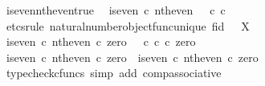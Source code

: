 \begin{isabellebody}
\endisatagproof
{\isafoldproof}%
%
\isadelimproof
\isanewline
%
\endisadelimproof
\isanewline
{}\isamarkupfalse%
\ is{\isacharunderscore}{\kern0pt}even{\isacharunderscore}{\kern0pt}nth{\isacharunderscore}{\kern0pt}even{\isacharunderscore}{\kern0pt}true{\isacharcolon}{\kern0pt}\isanewline
\ \ {\isachardoublequoteopen}is{\isacharunderscore}{\kern0pt}even\ {\isasymcirc}\isactrlsub c\ nth{\isacharunderscore}{\kern0pt}even\ {\isacharequal}{\kern0pt}\ {\isasymt}\ {\isasymcirc}\isactrlsub c\ {\isasymbeta}\isactrlbsub {\isasymnat}\isactrlsub c\isactrlesub {\isachardoublequoteclose}\isanewline
%
\isadelimproof
%
\endisadelimproof
%
\isatagproof
{}\isamarkupfalse%
\ {\isacharparenleft}{\kern0pt}etcs{\isacharunderscore}{\kern0pt}rule\ natural{\isacharunderscore}{\kern0pt}number{\isacharunderscore}{\kern0pt}object{\isacharunderscore}{\kern0pt}func{\isacharunderscore}{\kern0pt}unique{\isacharbrackleft}{\kern0pt}\ f{\isacharequal}{\kern0pt}{\isachardoublequoteopen}id\ {\isasymOmega}{\isachardoublequoteclose}{\isacharcomma}{\kern0pt}\ \ X{\isacharequal}{\kern0pt}{\isasymOmega}{\isacharbrackright}{\kern0pt}{\isacharparenright}{\kern0pt}\isanewline
\ \ \isamarkupfalse%
\ {\isachardoublequoteopen}{\isacharparenleft}{\kern0pt}is{\isacharunderscore}{\kern0pt}even\ {\isasymcirc}\isactrlsub c\ nth{\isacharunderscore}{\kern0pt}even{\isacharparenright}{\kern0pt}\ {\isasymcirc}\isactrlsub c\ zero\ {\isacharequal}{\kern0pt}\ {\isacharparenleft}{\kern0pt}{\isasymt}\ {\isasymcirc}\isactrlsub c\ {\isasymbeta}\isactrlbsub {\isasymnat}\isactrlsub c\isactrlesub {\isacharparenright}{\kern0pt}\ {\isasymcirc}\isactrlsub c\ zero{\isachardoublequoteclose}\isanewline
\ \ \isamarkupfalse%
\ {\isacharminus}{\kern0pt}\isanewline
\ \ \ \ \isamarkupfalse%
\ {\isachardoublequoteopen}{\isacharparenleft}{\kern0pt}is{\isacharunderscore}{\kern0pt}even\ {\isasymcirc}\isactrlsub c\ nth{\isacharunderscore}{\kern0pt}even{\isacharparenright}{\kern0pt}\ {\isasymcirc}\isactrlsub c\ zero\ {\isacharequal}{\kern0pt}\ is{\isacharunderscore}{\kern0pt}even\ {\isasymcirc}\isactrlsub c\ nth{\isacharunderscore}{\kern0pt}even\ {\isasymcirc}\isactrlsub c\ zero{\isachardoublequoteclose}\isanewline
\ \ \ \ \ \ \isamarkupfalse%
\ {\isacharparenleft}{\kern0pt}typecheck{\isacharunderscore}{\kern0pt}cfuncs{\isacharcomma}{\kern0pt}\ simp\ add{\isacharcolon}{\kern0pt}\ comp{\isacharunderscore}{\kern0pt}associative{}{\isacharparenright}{\kern0pt}\isanewline
\ \ \ \ \isamarkupfalse%

\end{isabellebody}
